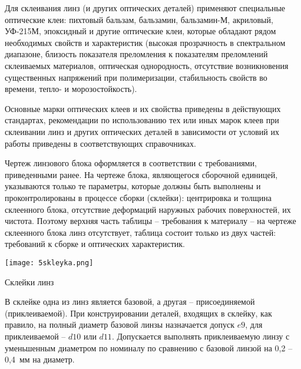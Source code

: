 Для склеивания линз (и других оптических деталей) применяют специальные оптические клеи: пихтовый бальзам, бальзамин, бальзамин-М, акриловый, УФ-215М, эпоксидный и другие оптические клеи, которые обладают рядом необходимых свойств и характеристик (высокая прозрачность в спектральном диапазоне, близость показателя преломления к показателям преломлений склеиваемых материалов, оптическая однородность, отсутствие возникновения существенных напряжений при полимеризации, стабильность свойств во времени, тепло- и морозостойкость).

Основные марки оптических клеев и их свойства приведены в действующих стандартах, рекомендации по использованию тех или иных марок клеев при склеивании линз и других оптических деталей в зависимости от условий их работы приведены в соответствующих справочниках.

Чертеж линзового блока оформляется в соответствии с требованиями, приведенными ранее. На чертеже блока, являющегося сборочной единицей, указываются только те параметры, которые должны быть выполнены и проконтролированы в процессе сборки (склейки): центрировка и толщина склеенного блока, отсутствие деформаций наружных рабочих поверхностей, их чистота. Поэтому верхняя часть таблицы -- требования к материалу -- на чертеже склеенного блока линз отсутствует, таблица состоит только из двух частей: требований к сборке и оптических характеристик.

\begin{marginfigure}
	\texttt{[image: 5skleyka.png]}
	\caption{Склейки линз}
	\label{pic:5skleyka}
\end{marginfigure}

В склейке одна из линз является базовой, а другая -- присоединяемой (приклеиваемой). При конструировании деталей, входящих в склейку, как правило, на полный диаметр базовой линзы назначается допуск $ e9 $, для приклеиваемой -- $ d10 $ или $ d11 $. Допускается выполнять приклеиваемую линзу с уменьшенным диаметром по номиналу по сравнению с базовой линзой на 0,2 -- 0,4~мм на диаметр.

